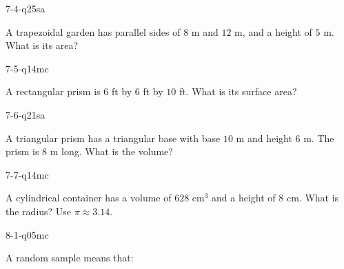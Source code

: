\begin{practiceQuestion}{7-4-q25}{sa}
\begin{questionText}
A trapezoidal garden has parallel sides of $8$ m and $12$ m, and a height of $5$ m. What is its area?
\end{questionText}
\end{practiceQuestion}

\begin{practiceQuestion}{7-5-q14}{mc}
\begin{questionText}
A rectangular prism is $6$ ft by $6$ ft by $10$ ft. What is its surface area?
\end{questionText}
\end{practiceQuestion}

\begin{practiceQuestion}{7-6-q21}{sa}
\begin{questionText}
A triangular prism has a triangular base with base $10$ m and height $6$ m. The prism is $8$ m long. What is the volume?
\end{questionText}
\end{practiceQuestion}

\begin{practiceQuestion}{7-7-q14}{mc}
\begin{questionText}
A cylindrical container has a volume of $628$ cm$^3$ and a height of $8$ cm. What is the radius? Use $\pi \approx 3.14$.
\end{questionText}
\end{practiceQuestion}

\begin{practiceQuestion}{8-1-q05}{mc}
\begin{questionText}
A random sample means that:
\end{questionText}
\end{practiceQuestion}

